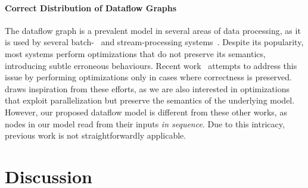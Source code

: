\documentclass[letterpaper,twocolumn,10pt]{article}
\newcommand{\km}[1]{[{\color{blue}#1 --- km}]}
\begin{document}
\paragraph{Correct Distribution of Dataflow Graphs}
%
The dataflow graph is a prevalent model in several areas of data
processing, as it is used by several batch-~\cite{mapreduce:08,
  spark:12} and stream-processing systems~\cite{murray2013naiad,
  carbone2015flink}. Despite its popularity, most systems perform
optimizations that do not preserve its semantics, introducing subtle
erroneous behaviours. Recent work~\cite{HSSGG2014, SHGW2015,
  MSAIT2019} attempts to address this issue by performing
optimizations only in cases where correctness is preserved. \sys draws
inspiration from these efforts, as we are also interested in
optimizations that exploit parallelization but preserve the semantics
of the underlying model. However, our proposed dataflow model is
different from these other works, as nodes in our model read from
their inputs \emph{in sequence}. Due to this intricacy, previous work
is not straightforwardly applicable.


  

  


\section{Discussion}
\label{discussion}
\end{document}
